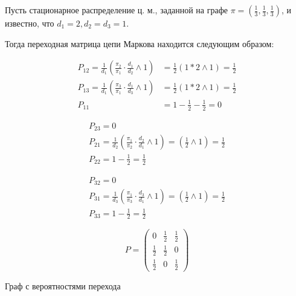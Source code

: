 \documentclass[a4paper,12pt]{article} %
\begin{document}
Пусть стационарное распределение ц. м., заданной на графе $\pi=\left(\frac{1}{3}, \frac{1}{3}, \frac{1}{3}\right)$, и известно, что $d_{1}=2, d_{2}=d_{3}=1$.

Тогда переходная матрица цепи Маркова находится следующим образом: 



$$\begin{aligned}
P_{12}=\frac{1}{d_{1}}\left(\frac{\pi_{2}}{\pi_{1}} \cdot \frac{d_{1}}{d_{2}} \wedge 1\right) &=\frac{1}{2}\left(1 * 2  \wedge 1\right)=\frac{1}{2} \\
P_{13}=\frac{1}{d_{1}}\left(\frac{\pi_{3}}{\pi_{1}} \cdot \frac{d_{1}}{d_{3}}  \wedge 1\right) &=\frac{1}{2}\left(1 * 2\wedge 1\right)=\frac{1}{2} \\ P_{11}& =1-\frac{1}{2}-\frac{1}{2}=0
\end{aligned}$$


$$\begin{array}{c}
P_{23}=0 \\
P_{21}=\frac{1}{d_{2}}\left(\frac{\pi_{1}}{\pi_{2}} \cdot \frac{d_{2}}{d_{1}}\wedge 1\right)=\left(\frac{1}{2}\wedge 1\right)=\frac{1}{2} \\
P_{22}=1-\frac{1}{2}=\frac{1}{2}
\end{array}$$



$$\begin{array}{c}
P_{32}=0 \\
P_{31}=\frac{1}{d_{3}}\left(\frac{\pi_{1}}{\pi_{3}} \cdot \frac{d_{3}}{d_{1}}\wedge1\right)=\left(\frac{1}{2}\wedge 1\right)=\frac{1}{2} \\
 P_{33}=1-\frac{1}{2}=\frac{1}{2}
\end{array}$$


$$P=\left(\begin{array}{ccc}
0 & \frac{1}{2} & \frac{1}{2} \\
\frac{1}{2} & \frac{1}{2} & 0 \\
\frac{1}{2} & 0 & \frac{1}{2}
\end{array}\right)$$


Граф с вероятностями перехода
\end{document}
